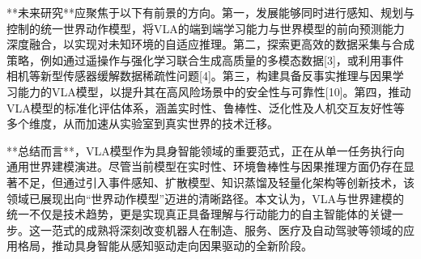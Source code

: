\documentclass{article}
\begin{document}
**未来研究**应聚焦于以下有前景的方向。第一，发展能够同时进行感知、规划与控制的统一世界动作模型，将VLA的端到端学习能力与世界模型的前向预测能力深度融合，以实现对未知环境的自适应推理。第二，探索更高效的数据采集与合成策略，例如通过遥操作与强化学习联合生成高质量的多模态数据[3]，或利用事件相机等新型传感器缓解数据稀疏性问题[4]。第三，构建具备反事实推理与因果学习能力的VLA模型，以提升其在高风险场景中的安全性与可靠性[10]。第四，推动VLA模型的标准化评估体系，涵盖实时性、鲁棒性、泛化性及人机交互友好性等多个维度，从而加速从实验室到真实世界的技术迁移。

**总结而言**，VLA模型作为具身智能领域的重要范式，正在从单一任务执行向通用世界建模演进。尽管当前模型在实时性、环境鲁棒性与因果推理方面仍存在显著不足，但通过引入事件感知、扩散模型、知识蒸馏及轻量化架构等创新技术，该领域已展现出向“世界动作模型”迈进的清晰路径。本文认为，VLA与世界建模的统一不仅是技术趋势，更是实现真正具备理解与行动能力的自主智能体的关键一步。这一范式的成熟将深刻改变机器人在制造、服务、医疗及自动驾驶等领域的应用格局，推动具身智能从感知驱动走向因果驱动的全新阶段。
\end{document}
